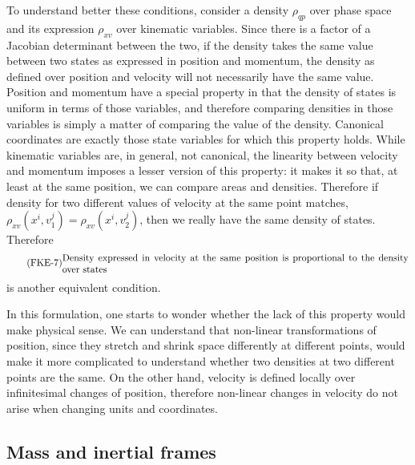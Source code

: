 To understand better these conditions, consider a density $\rho_{qp}$ over phase space and its expression $\rho_{xv}$ over kinematic variables. Since there is a factor of a Jacobian determinant between the two, if the density takes the same value between two states as expressed in position and momentum, the density as defined over position and velocity will not necessarily have the same value. Position and momentum have a special property in that the density of states is uniform in terms of those variables, and therefore comparing densities in those variables is simply a matter of comparing the value of the density. Canonical coordinates are exactly those state variables for which this property holds. While kinematic variables are, in general, not canonical, the linearity between velocity and momentum imposes a lesser version of this property: it makes it so that, at least at the same position, we can compare areas and densities. Therefore if density for two different values of velocity at the same point matches, $\rho_{xv}(x^i, v_1^j) = \rho_{xv}(x^i, v_2^j)$, then we really have the same density of states. Therefore
\begin{equation}
	\tag{FKE-7}\label{rp-cm-fke-condDensityVelocity}
	\parbox{5in}{Density expressed in velocity at the same position is proportional to the density over states}
\end{equation}
is another equivalent condition.

In this formulation, one starts to wonder whether the lack of this property would make physical sense. We can understand that non-linear transformations of position, since they stretch and shrink space differently at different points, would make it more complicated to understand whether two densities at two different points are the same. On the other hand, velocity is defined locally over infinitesimal changes of position, therefore non-linear changes in velocity do not arise when changing units and coordinates.

\subsection{Mass and inertial frames}

